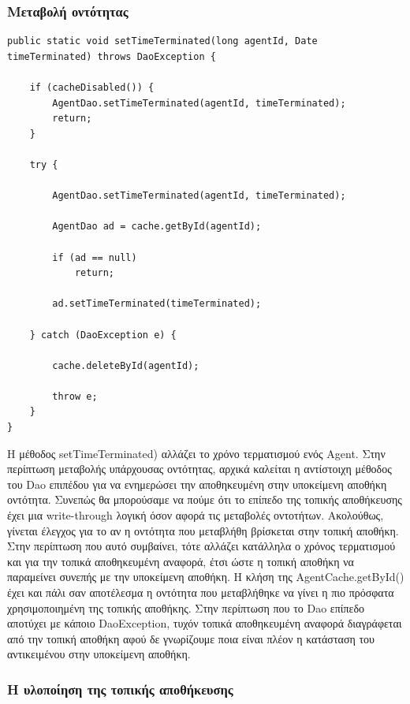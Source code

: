 \documentclass[a4paper,11pt]{article}
\begin{document}
\begin{sloppypar}
\newpage


\subsubsection{Μεταβολή οντότητας}

\begin{lstlisting}
public static void setTimeTerminated(long agentId, Date timeTerminated) throws DaoException {

    if (cacheDisabled()) {
        AgentDao.setTimeTerminated(agentId, timeTerminated);
        return;
    }

    try {

        AgentDao.setTimeTerminated(agentId, timeTerminated);

        AgentDao ad = cache.getById(agentId);

        if (ad == null)
            return;

        ad.setTimeTerminated(timeTerminated);

    } catch (DaoException e) {

        cache.deleteById(agentId);

        throw e;
    }
}
\end{lstlisting}

Η μέθοδος setTimeTerminated) αλλάζει το χρόνο τερματισμού ενός Agent. Στην περίπτωση μεταβολής υπάρχουσας οντότητας, αρχικά καλείται η αντίστοιχη μέθοδος του Dao επιπέδου για να ενημερώσει την αποθηκευμένη στην υποκείμενη αποθήκη οντότητα. Συνεπώς θα μπορούσαμε να πούμε ότι το επίπεδο της τοπικής αποθήκευσης έχει μια write-through λογική όσον αφορά τις μεταβολές οντοτήτων. Ακολούθως, γίνεται έλεγχος για το αν η οντότητα που μεταβλήθη βρίσκεται στην τοπική αποθήκη. Στην περίπτωση που αυτό συμβαίνει, τότε αλλάζει κατάλληλα ο χρόνος τερματισμού και για την τοπικά αποθηκευμένη αναφορά, έτσι ώστε η τοπική αποθήκη να παραμείνει συνεπής με την υποκείμενη αποθήκη. Η κλήση της AgentCache.getById() έχει και πάλι σαν αποτέλεσμα η οντότητα που μεταβλήθηκε να γίνει η πιο πρόσφατα χρησιμοποιημένη της τοπικής αποθήκης. Στην περίπτωση που το Dao επίπεδο αποτύχει με κάποιο DaoException, τυχόν τοπικά αποθηκευμένη αναφορά διαγράφεται από την τοπική αποθήκη αφού δε γνωρίζουμε ποια είναι πλέον η κατάσταση του αντικειμένου στην υποκείμενη αποθήκη.

\newpage


\subsubsection{Η υλοποίηση της τοπικής αποθήκευσης}


\end{sloppypar}
\end{document}
